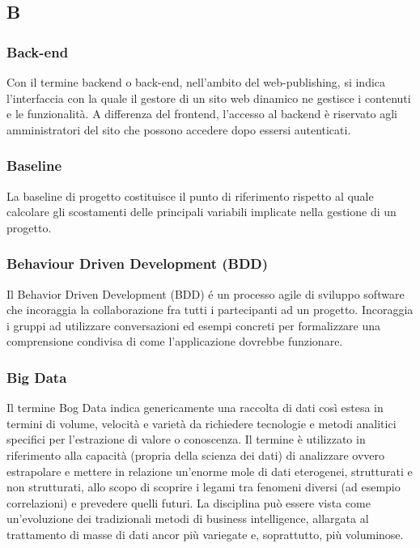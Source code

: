 \subsection*{\textbf{\hfill \Huge{B} \hfill}} 
\subsubsection*{Back-end}
Con il termine backend o back-end, nell'ambito del web-publishing, si indica l'interfaccia con la quale il gestore di un sito web dinamico ne gestisce i contenuti e le funzionalità. A differenza del frontend, l'accesso al backend è riservato agli amministratori del sito che possono accedere dopo essersi autenticati.
\subsubsection*{Baseline}
La baseline di progetto costituisce il punto di riferimento rispetto al quale calcolare gli scostamenti delle principali variabili implicate nella gestione di un progetto.
\subsubsection*{Behaviour Driven Development (BDD)}
Il Behavior Driven Development (BDD) é un processo agile di sviluppo software che incoraggia la collaborazione fra tutti i partecipanti ad un progetto. Incoraggia i gruppi ad utilizzare conversazioni ed esempi concreti per formalizzare una comprensione condivisa di come l'applicazione dovrebbe funzionare.
\subsubsection*{Big Data}
Il termine Bog Data indica genericamente una raccolta di dati così estesa in termini di volume, velocità e varietà da richiedere tecnologie e metodi analitici specifici per l'estrazione di valore o conoscenza. Il termine è utilizzato in riferimento alla capacità (propria della scienza dei dati) di analizzare ovvero estrapolare e mettere in relazione un'enorme mole di dati eterogenei, strutturati e non strutturati, allo scopo di scoprire i legami tra fenomeni diversi (ad esempio correlazioni) e prevedere quelli futuri. La disciplina può essere vista come un'evoluzione dei tradizionali metodi di business intelligence, allargata al trattamento di masse di dati ancor più variegate e, soprattutto, più voluminose.
